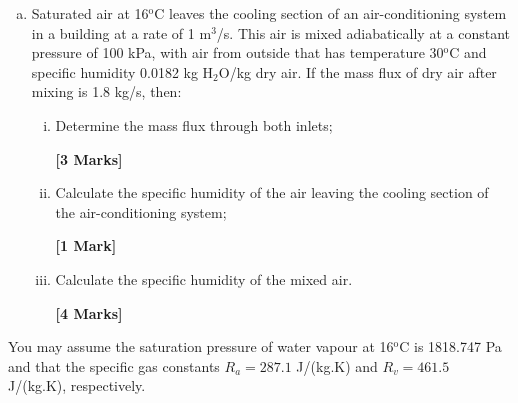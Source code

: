 \documentclass[calculator,refrigeranttables,datasheet,resit]{exam}
\begin{document}
\begin{question}
\begin{enumerate}[(a)]
\item Saturated air at 16$^{\text{o}}$C leaves the cooling section of an air-conditioning system in a building at a rate of 1 m$^{3}$/s. This air is mixed adiabatically at a constant pressure of 100 kPa, with air from outside that has temperature 30$^{\text{o}}$C and specific humidity 0.0182 kg H$_{2}$O/kg dry air. If the mass flux of dry air after mixing is 1.8 kg/s, then:
\begin{enumerate}[(i)]
\item Determine the mass flux through both inlets;
\begin{flushright}
{\bf [3 Marks]}
\end{flushright} 
\item Calculate the specific humidity of the air leaving the cooling section of the air-conditioning system;
\begin{flushright}
{\bf [1 Mark]}
\end{flushright} 
\item Calculate the specific humidity of the mixed air. 
\begin{flushright}
{\bf [4 Marks]}
\end{flushright} 
\end{enumerate}
\end{enumerate}
You may assume the saturation pressure of water vapour at 16$^{\text{o}}$C is 1818.747 Pa and that the specific gas constants $R_{a}=287.1$ J/(kg.K) and $R_{v}=461.5$ J/(kg.K), respectively.
\end{question}



\vfill

\paperend
\end{document}
